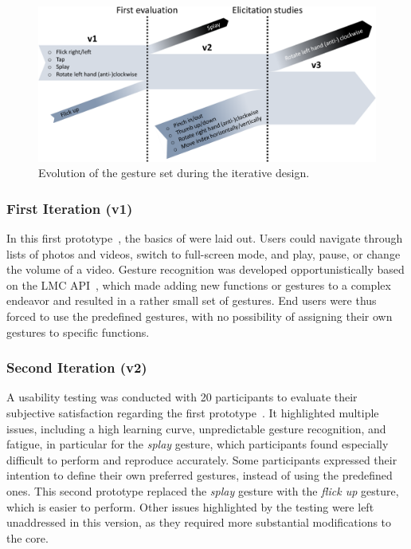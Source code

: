 \begin{figure}[!b]
    \centering
    \includegraphics[width=\linewidth]{Figures/LUI/Overview/gesture-set-evolution.pdf}
    \vspace{-8pt}
    \caption{Evolution of the gesture set during the iterative design.}
    \label{fig:lui:gesture-set-evolution}
\end{figure}

\subsubsection{First Iteration (v1)}
In this first prototype~\cite{Parthiban:2019}, the basics of \lui were laid out. Users could navigate through lists of photos and videos, switch to full-screen mode, and play, pause, or change the volume of a video. Gesture recognition was developed opportunistically based on the LMC API~\cite{Spiegelmock:2013}, which made adding new functions or gestures to \lui a complex endeavor and resulted in a rather small set of gestures. End users were thus forced to use the predefined gestures, with no possibility of assigning their own gestures to specific functions.

\subsubsection{Second Iteration (v2)}
A usability testing was conducted with 20 participants to evaluate their subjective satisfaction regarding the first prototype~\cite{Parthiban:2019,Dumas:2019}. It highlighted multiple issues, including a high learning curve, unpredictable gesture recognition, and fatigue, in particular for the \textit{splay} gesture, which participants found especially difficult to perform and reproduce accurately. 
Some participants expressed their intention to define their own preferred gestures, instead of using the predefined ones.
This second prototype replaced the \textit{splay} gesture with the \textit{flick up} gesture, which is easier to perform. Other issues highlighted by the testing were left unaddressed in this version, as they required more substantial modifications to the \lui core.

